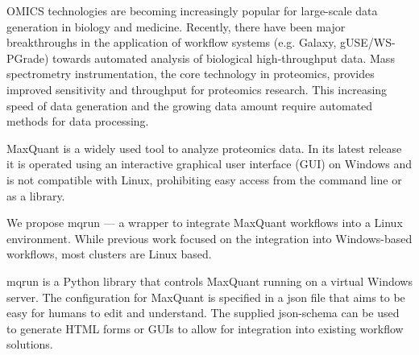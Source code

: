 OMICS technologies are becoming increasingly popular for large-scale data
generation in biology and medicine. Recently, there have been major
breakthroughs in the application of workflow systems (e.g.  Galaxy,
gUSE/WS-PGrade) towards automated analysis of biological high-throughput data.
Mass spectrometry instrumentation, the core technology in proteomics, provides
improved sensitivity and throughput for proteomics research. This increasing
speed of data generation and the growing data amount require automated methods
for data processing.

MaxQuant is a widely used tool to analyze proteomics data. In its latest
release it is operated using an interactive graphical user interface (GUI) on
Windows and is not compatible with Linux, prohibiting easy access from the
command line or as a library.

We propose mqrun — a wrapper to integrate MaxQuant workflows into a Linux
environment. While previous work focused on the integration into Windows-based
workflows, most clusters are Linux based.

mqrun is a Python library that controls MaxQuant running on a virtual Windows
server. The configuration for MaxQuant is specified in a json file that aims to
be easy for humans to edit and understand. The supplied json-schema can be used
to generate HTML forms or GUIs to allow for integration into existing workflow
solutions.
